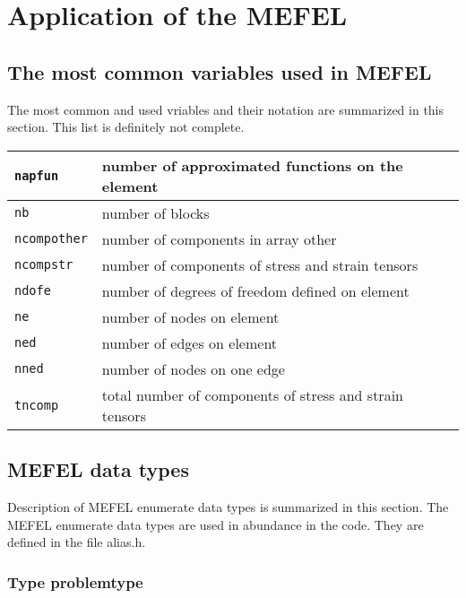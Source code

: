 \chapter{Application of the MEFEL}

\section{The most common variables used in MEFEL}

The most common and used vriables and their notation are summarized in this section.
This list is definitely not complete.

\begin{center}
\begin{tabular}{|l|l|}
\hline
{\tt napfun} & number of approximated functions on the element
\\ \hline
{\tt nb} & number of blocks
\\ \hline
{\tt ncompother} & number of components in array other
\\ \hline
{\tt ncompstr} & number of components of stress and strain tensors
\\ \hline
{\tt ndofe} & number of degrees of freedom defined on element
\\ \hline
{\tt ne} & number of nodes on element
\\ \hline
{\tt ned} & number of edges on element
\\ \hline
{\tt nned} & number of nodes on one edge
\\ \hline
{\tt tncomp} & total number of components of stress and strain tensors
\\ \hline
\end{tabular}
\end{center}

\section{MEFEL data types}

Description of MEFEL enumerate data types is summarized in this section.
The MEFEL enumerate data types are used in abundance in the code. They are defined
in the file alias.h.

\subsection{Type {\sf problemtype}}
\label{sectproblemtype}

